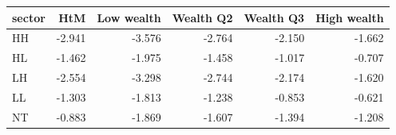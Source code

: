 \begin{tabular}{lrrrrr}
\toprule
sector & HtM & Low wealth & Wealth Q2 & Wealth Q3 & High wealth \\
\midrule
HH & -2.941 & -3.576 & -2.764 & -2.150 & -1.662 \\
HL & -1.462 & -1.975 & -1.458 & -1.017 & -0.707 \\
LH & -2.554 & -3.298 & -2.744 & -2.174 & -1.620 \\
LL & -1.303 & -1.813 & -1.238 & -0.853 & -0.621 \\
NT & -0.883 & -1.869 & -1.607 & -1.394 & -1.208 \\
\bottomrule
\end{tabular}
